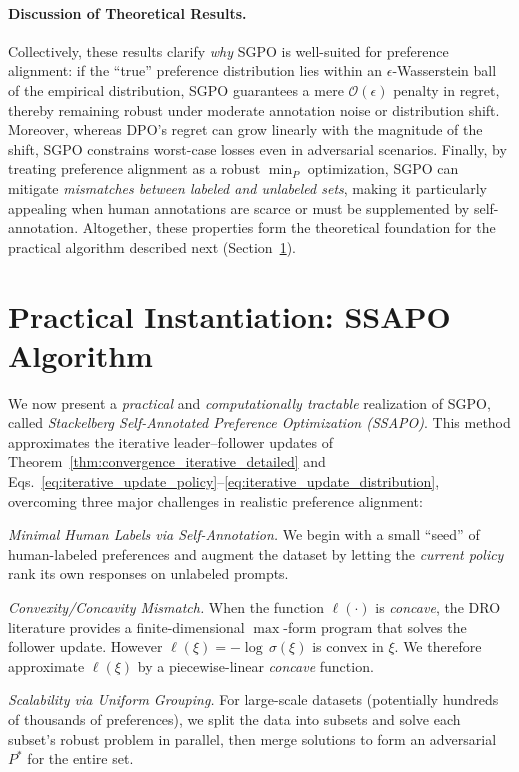 \paragraph{Discussion of Theoretical Results.}
Collectively, these results clarify \emph{why} SGPO is well-suited for preference alignment: if the “true” preference distribution lies within an $\epsilon$-Wasserstein ball of the empirical distribution, SGPO guarantees a mere $\mathcal{O}(\epsilon)$ penalty in regret, thereby remaining robust under moderate annotation noise or distribution shift.  Moreover, whereas DPO’s regret can grow linearly with the magnitude of the shift, SGPO constrains worst-case losses even in adversarial scenarios.  Finally, by treating preference alignment as a robust $\min_{P}$ optimization, SGPO can mitigate \emph{mismatches between labeled and unlabeled sets}, making it particularly appealing when human annotations are scarce or must be supplemented by self-annotation.  Altogether, these properties form the theoretical foundation for the practical algorithm described next (Section~\ref{sec:ssapo}). 

\section{Practical Instantiation: SSAPO Algorithm}
\label{sec:ssapo}
We now present a \emph{practical} and \emph{computationally tractable} realization of SGPO, 
called \emph{Stackelberg Self-Annotated Preference Optimization (SSAPO)}. 
This method approximates the iterative leader--follower updates 
of Theorem~\ref{thm:convergence_iterative_detailed} 
and Eqs.~\eqref{eq:iterative_update_policy}--\eqref{eq:iterative_update_distribution}, 
overcoming three major challenges in realistic preference alignment:

\begin{compactenum}
    \item \emph{Minimal Human Labels via Self-Annotation.}  We begin with a small “seed” of human-labeled preferences and augment the dataset 
    by letting the \emph{current policy} rank its own responses on unlabeled prompts.
    \item \emph{Convexity/Concavity Mismatch.} When the function \(\ell(\cdot) \) is \emph{concave}, the DRO literature \citet{Esfahani2018Data} provides a finite-dimensional \(\max\)-form program that solves the follower update. However \(\ell(\xi) = -\!\log\,\sigma(\xi)\) is convex in $\xi$. We therefore approximate \(\ell(\xi)\) by a piecewise-linear \emph{concave} function. 
    \item \emph{Scalability via Uniform Grouping.} 
    For large-scale datasets (potentially hundreds of thousands of preferences), we split the data into subsets and solve each subset’s robust problem in parallel, then merge solutions to form an adversarial $P^*$ for the entire set.
\end{compactenum}

